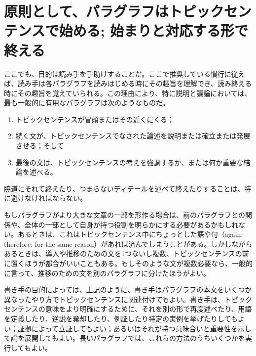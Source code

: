 \section{原則として、パラグラフはトピックセンテンスで始める; 始まりと対応する形で終える}
ここでも、目的は読み手を手助けすることだ。ここで推奨している慣行に従えば、読み手は各パラグラフを読みはじめる時にその趣旨を理解でき、読み終える時にその趣旨を覚えていられる。この理由により、特に説明と議論においては、最も一般的に有用なパラグラフは次のようなものだ。
\begin{enumerate}
    \item トピックセンテンスが冒頭またはその近くにくる；
    \item 続く文が、トピックセンテンスでなされた論述を説明または確立または発展させる；そして
    \item 最後の文は、トピックセンテンスの考えを強調するか、または何か重要な結論を述べる。
\end{enumerate}
脇道にそれて終えたり、つまらないディテールを述べて終えたりすることは、特に避けなければならない。
\par
もしパラグラフがより大きな文章の一部を形作る場合は、前のパラグラフとの関係や、全体の一部として自身が持つ役割を明らかにする必要があるかもしれない。あるときは、これはトピックセンテンス中にちょっとした語や句（again;
therefore; for the same
reason）があれば済んでしまうことがある。しかしながらあるときは、導入や推移のための文を1つないし複数、トピックセンテンスの前に置くほうが都合がいいこともある。もしそのような文が複数必要なら、一般的に言って、推移のための文を別のパラグラフに分けたほうがよい。
\par
書き手の目的によっては、上記のように、書き手はパラグラフの本文をいくつか異なったやり方でトピックセンテンスに関連付けてもよい。書き手は、トピックセンテンスの意味をより明確にするために、それを別の形で再度述べたり、用語を定義したり、逆説を棄却したり、例証したり特定の実例を挙げたりしてもよい；証拠によって立証してもよい；あるいはそれが持つ意味合いと重要性を示して論を展開してもよい。長いパラグラフでは、これらの方法のうちいくつかを実行してもよい。
